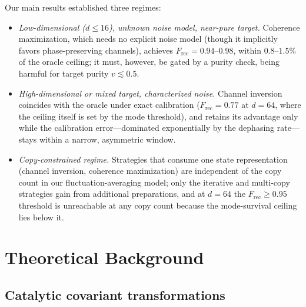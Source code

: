 \documentclass[12pt,a4paper]{article}
\newcommand{\Frec}{F_\mathrm{rec}}
\begin{document}
Our main results established three regimes:
\begin{itemize}
\item \emph{Low-dimensional ($d \leq 16$), unknown noise model, near-pure target.} Coherence maximization, which needs no explicit noise model (though it implicitly favors phase-preserving channels), achieves $\Frec = 0.94$--$0.98$, within $0.8$--$1.5\%$ of the oracle ceiling; it must, however, be gated by a purity check, being harmful for target purity $v \lesssim 0.5$.
\item \emph{High-dimensional or mixed target, characterized noise.} Channel inversion coincides with the oracle under exact calibration ($\Frec = 0.77$ at $d = 64$, where the ceiling itself is set by the mode threshold), and retains its advantage only while the calibration error---dominated exponentially by the dephasing rate---stays within a narrow, asymmetric window.
\item \emph{Copy-constrained regime.} Strategies that consume one state representation (channel inversion, coherence maximization) are independent of the copy count in our fluctuation-averaging model; only the iterative and multi-copy strategies gain from additional preparations, and at $d = 64$ the $\Frec \geq 0.95$ threshold is unreachable at any copy count because the mode-survival ceiling lies below it.
\end{itemize}


\section{Theoretical Background}
\label{sec:theory}

\subsection{Catalytic covariant transformations}
\label{sec:catalytic}
\end{document}
